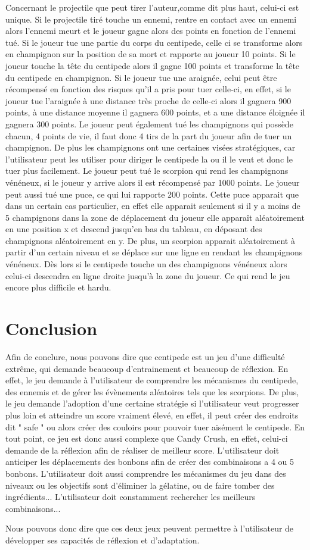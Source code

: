 \documentclass[a4paper, 12pt, twoside]{article}
\begin{document}
Concernant le projectile que peut tirer l'auteur,comme dit plus haut, celui-ci est unique. Si le projectile tiré touche un ennemi, rentre en contact avec un ennemi alors l'ennemi meurt et le joueur gagne alors des points en fonction de l'ennemi tué. Si le joueur tue une partie du corps du centipede, celle ci se transforme alors en champignon sur la position de sa mort et rapporte au joueur 10 points. Si le joueur touche la tête du centipede alors il gagne 100 points et transforme la tête du centipede en champignon. Si le joueur tue une araignée, celui peut être récompensé en fonction des risques qu'il a pris pour tuer celle-ci, en effet, si le joueur tue l'araignée à une distance très proche de celle-ci alors il gagnera 900 points, à une distance moyenne il gagnera 600 points, et a une distance éloignée il gagnera 300 points. Le joueur peut également tué les champignons qui possède chacun, 4 points de vie, il faut donc 4 tirs de la part du joueur afin de tuer un champignon. De plus les champignons ont une certaines visées stratégiques, car l'utilisateur peut les utiliser pour diriger le centipede la ou il le veut et donc le tuer plus facilement. Le joueur peut tué le scorpion qui rend les champignons vénéneux, si le joueur y arrive alors il est récompensé par 1000 points. Le joueur peut aussi tué une puce, ce qui lui rapporte 200 points. Cette puce apparait que dans un certain cas particulier, en effet elle apparait seulement si il y a moins de 5 champignons dans la zone de déplacement du joueur elle apparaît aléatoirement en une position x et  descend jusqu'en bas du tableau, en déposant des champignons aléatoirement en y.  De plus, un scorpion apparait aléatoirement à partir d'un certain niveau et se déplace sur une ligne en rendant les champignons vénéneux. Dès lors si le centipede touche un des champignons vénéneux alors celui-ci descendra en ligne droite jusqu'à la zone du joueur. Ce qui rend le jeu encore plus difficile et hardu.

\section{Conclusion}

Afin de conclure, nous pouvons dire que centipede est un jeu d'une difficulté extrême, qui demande beaucoup d'entrainement  et beaucoup de réflexion. En effet, le jeu demande à l'utilisateur de comprendre les mécanismes du centipede, des ennemis et de gérer les évènements aléatoires tels que les scorpions. De plus, le jeu demande l'adoption d'une certaine stratégie si l'utilisateur veut progresser plus loin et atteindre un score vraiment élevé, en effet, il peut créer des endroits dit " safe " ou alors créer des couloirs pour pouvoir tuer aisément le centipede. En tout point, ce jeu est donc aussi complexe que Candy Crush, en effet, celui-ci demande de la réflexion afin de réaliser de meilleur score. L'utilisateur doit anticiper les déplacements des bonbons afin de créer des combinaisons a 4 ou 5 bonbons. L'utilisateur doit aussi comprendre les mécanismes du jeu dans des niveaux ou les objectifs sont d'éliminer la gélatine, ou de faire tomber des ingrédients... L'utilisateur doit constamment rechercher les meilleurs combinaisons... 

Nous pouvons donc dire que ces deux jeux peuvent permettre à l'utilisateur de développer ses capacités de réflexion et d'adaptation.
\end{document}
